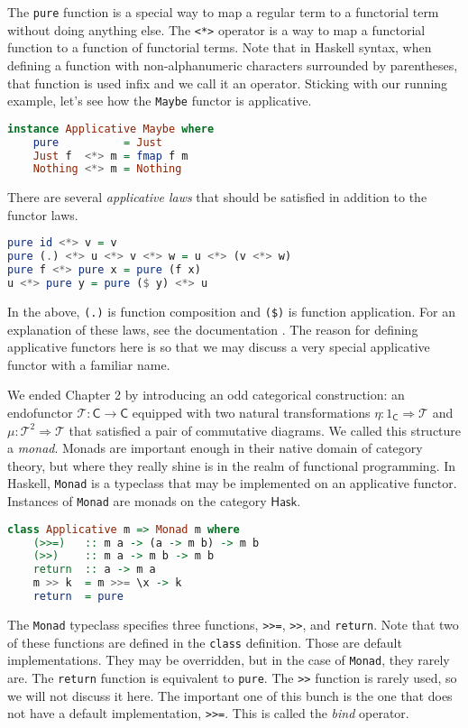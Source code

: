 \documentclass[MS, xcolor=dvipsnames]{wfuthesis}
\def\sC{\mathsf{C}}
\def\cT{\mathcal{T}}
\def\Hask{\mathsf{Hask}}
\theoremstyle{definition}
\begin{document}
The \lstinline{pure} function is a special way to map a regular term to a functorial term without doing anything else. The \lstinline{<*>} operator is a way to map a functorial function to a function of functorial terms. Note that in Haskell syntax, when defining a function with non-alphanumeric characters surrounded by parentheses, that function is used infix and we call it an operator. Sticking with our running example, let's see how the \lstinline{Maybe} functor is applicative.
\begin{lstlisting}[language=Haskell]
instance Applicative Maybe where
    pure          = Just
    Just f  <*> m = fmap f m
    Nothing <*> m = Nothing
\end{lstlisting}
There are several \emph{applicative laws} that should be satisfied in addition to the functor laws.
\begin{lstlisting}[language=Haskell]
pure id <*> v = v
pure (.) <*> u <*> v <*> w = u <*> (v <*> w)
pure f <*> pure x = pure (f x)
u <*> pure y = pure ($ y) <*> u
\end{lstlisting}
In the above, \lstinline{(.)} is function composition and \lstinline{($)} is function application. For an explanation of these laws, see the documentation \cite{Prelude}. The reason for defining applicative functors here is so that we may discuss a very special applicative functor with a familiar name. \par
We ended Chapter 2 by introducing an odd categorical construction: an endofunctor $\cT: \sC \to \sC$ equipped with two natural transformations $\eta: 1_\sC \Rightarrow \cT$ and $\mu: \cT^2 \Rightarrow \cT$ that satisfied a pair of commutative diagrams. We called this structure a \emph{monad}. Monads are important enough in their native domain of category theory, but where they really shine is in the realm of functional programming. In Haskell, \lstinline{Monad} is a typeclass that may be implemented on an applicative functor. Instances of \lstinline{Monad} are monads on the category $\Hask$.
\begin{lstlisting}[language=Haskell]
class Applicative m => Monad m where
    (>>=)   :: m a -> (a -> m b) -> m b
    (>>)    :: m a -> m b -> m b
    return  :: a -> m a
    m >> k  = m >>= \x -> k
    return  = pure
\end{lstlisting}
The \lstinline{Monad} typeclass specifies three functions, \lstinline{>>=}, \lstinline{>>}, and \lstinline{return}. Note that two of these functions are defined in the \lstinline{class} definition. Those are default implementations. They may be overridden, but in the case of \lstinline{Monad}, they rarely are. The \lstinline{return} function is equivalent to \lstinline{pure}. The \lstinline{>>} function is rarely used, so we will not discuss it here. The important one of this bunch is the one that does not have a default implementation, \lstinline{>>=}. This is called the \emph{bind} operator. \par
\end{document}
